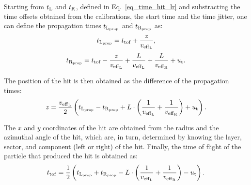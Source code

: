 Starting from $t_{\rm{L}}$ and $t_{\rm{R}}$, defined in Eq.~\ref{eq_time_hit_lr} and substracting the time offsets obtained from the calibrations, the start time and the time jitter, one can define the propagation times $t_{\rm{L}_{\rm{prop}}}$ and $t_{\rm{R}_{\rm{prop}}}$ as:
\begin{equation}
t_{\rm{L}_{\rm{prop}}}=t_{\rm{tof}}+\frac{z}{v_{\rm{eff}_{\rm{L}}}},
\end{equation}
\begin{equation}
t_{\rm{R}_{\rm{prop}}}=t_{\rm{tof}}-\frac{z}{v_{\rm{eff}_{\rm{L}}}}+\frac{L}{v_{\rm{eff}_{\rm{L}}}}+\frac{L}{v_{\rm{eff}_{\rm{R}}}}+u_{\rm{t}}.
\end{equation}

The position of the hit is then obtained as the difference of the propagation times:
\begin{equation}
z=\frac{v_{\rm{eff}_{\rm{L}}}}{2} \left(t_{\rm{L}_{\rm{prop}}}-t_{\rm{R}_{\rm{prop}}}+ L \cdot \left(\frac{1}{v_{\rm{eff}_{\rm{L}}}}+\frac{1}{v_{\rm{eff}_{\rm{R}}}}\right)  +u_{\rm{t}}\right).
\end{equation}

The $x$ and $y$ coordinates of the hit are obtained from the radius and the azimuthal angle of the hit, which are, in turn, determined by knowing the layer, sector, and component (left or right) of the hit. 
Finally, the time of flight of the particle that produced the hit is obtained as:
\begin{equation}
t_{\rm{tof}}= \frac{1}{2}\left(t_{\rm{L}_{\rm{prop}}}+t_{\rm{R}_{\rm{prop}}}- L \cdot \left(\frac{1}{v_{\rm{eff}_{\rm{L}}}}+\frac{1}{v_{\rm{eff}_{\rm{R}}}}\right)  -u_{\rm{t}}\right).
\end{equation}

